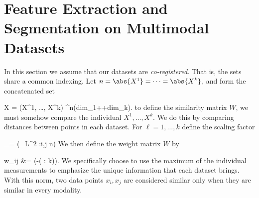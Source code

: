\documentclass[journal]{IEEEtran}
\newenvironment{myalign}{\par\nobreak\noindent\align}{\endalign}
\begin{document}
\section{Feature Extraction and Segmentation on Multimodal Datasets}
\label{sec:CoReg}
In this section we assume that our datasets are \emph{co-registered}. That is,
the sets share a common indexing. Let $n = \abs{X^1} = \cdots = \abs{X^k}$, and
form the concatenated set
\begin{myalign}
  X = (X^1, \ldots, X^k) \subseteq \R^{n\times (dim_1+\cdots+dim_k)}.
\end{myalign}
to define the similarity matrix $W$, we must somehow compare the individual
$X^1,\ldots,X^k$. We do this by comparing distances between points in each
dataset. For $\ell = 1,\ldots,k$ define the scaling factor
\begin{myalign}
  \lambda_\ell = \left(_{L^2}\; :\leq i,j
    \leq n\right)
\end{myalign}
We then define the weight matrix $W$ by
\begin{myalign}
  w_{ij} &= \left(-\max\left(\; : \leq \ell \leq k\right)\right).
\end{myalign}
We specifically choose to use the maximum of the individual measurements to
emphasize the unique information that each dataset brings. With this norm, two
data points $x_i,x_j$ are considered similar only when they are similar in every
modality.
\end{document}
